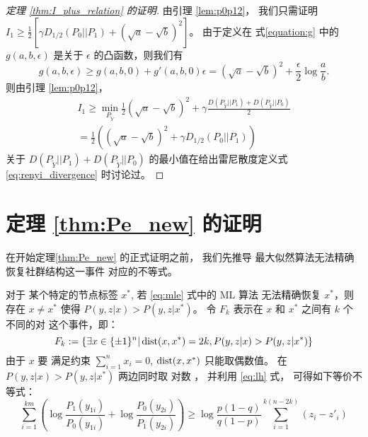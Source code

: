 \begin{proof}[定理 \ref{thm:I_plus_relation} 的证明]
    由引理 \ref{lem:p0p12}，
    我们只需证明 $I_1 \geq \frac{1}{2}[\gamma D_{1/2}(P_0||P_1)
    + (\sqrt{a} - \sqrt{b})^2]$。
    由于定义在 式\eqref{equation:g} 中的 $g(a,b,\epsilon)$ 是关于 $\epsilon$
    的凸函数，则我们有
    \begin{equation}\label{eq:g_linear}
            g(a,b,\epsilon) \geq g(a,b,0) + g'(a,b,0)\epsilon = (\sqrt{a} - \sqrt{b})^2 + \frac{\epsilon}{2}\log \frac{a}{b}. 
        \end{equation}
        则由引理 \ref{lem:p0p12}，
        \begin{align*}
            I_1 \geq \min_{P_{\widetilde{Y}}}
            \frac{1}{2}(\sqrt{a}-\sqrt{b})^2+\gamma
            \frac{D(P_{\widetilde{Y}} || P_1) + D(P_{\widetilde{Y}} || P_0)}{2} \\
            = \frac{1}{2}((\sqrt{a}-\sqrt{b})^2+\gamma D_{1/2}(P_0||P_1))
        \end{align*}
        关于 $D(P_{\widetilde{Y}} || P_1) + D(P_{\widetilde{Y}} || P_0)$
        的最小值在给出雷尼散度定义式 \eqref{eq:renyi_divergence}
        时讨论过。
\end{proof}
\section{定理 \ref{thm:Pe_new} 的证明}

在开始定理\ref{thm:Pe_new} 的正式证明之前，
我们先推导
最大似然算法无法精确恢复社群结构这一事件
对应的不等式。

对于
某个特定的节点标签
$x^*$,
若
\eqref{eq:mle} 式中的 ML 算法
无法精确恢复 
$x^*$，则
存在 $x\neq x^*$ 使得 $P(y,z|x) > P(y,z|x^*)$。
令 $F_k$ 表示在 $x$ 和 $x^*$ 之间有 $k$ 个不同的对
这个事件，即：
    \begin{equation}\label{eq:Fk}
    F_k:=\{\exists x \in \{\pm 1\}^n |
    \operatorname{dist}(x, x^*)=2k,
    P(y,z|x) > 
    P(y,z|x^*) \}
    \end{equation}
    由于
    $x$ 要 满足约束
    $\sum_{i=1}^n x_i=0$,
    $\operatorname{dist}(x, x^*)$
    只能取偶数值。
    在
    $P(y,z|x) > P(y,z|x^*)$
    两边同时取
    对数
    ， 并利用
    \eqref{eq:lh} 式，
    可得如下等价不等式：
    \begin{equation}\label{eq:ein}
    \sum_{i=1}^{km}
    \left(\log \frac{P_1(y_{1i})}
    {P_0(y_{1i})}
    + \log \frac{P_0(y_{2i})}
    {P_1(y_{2i})}
    \right)
    \geq \log \frac{p(1-q)}{q(1-p)} \sum_{i=1}^{k(n-2k)}(z_{i} - z'_{i})
    \end{equation}
    
